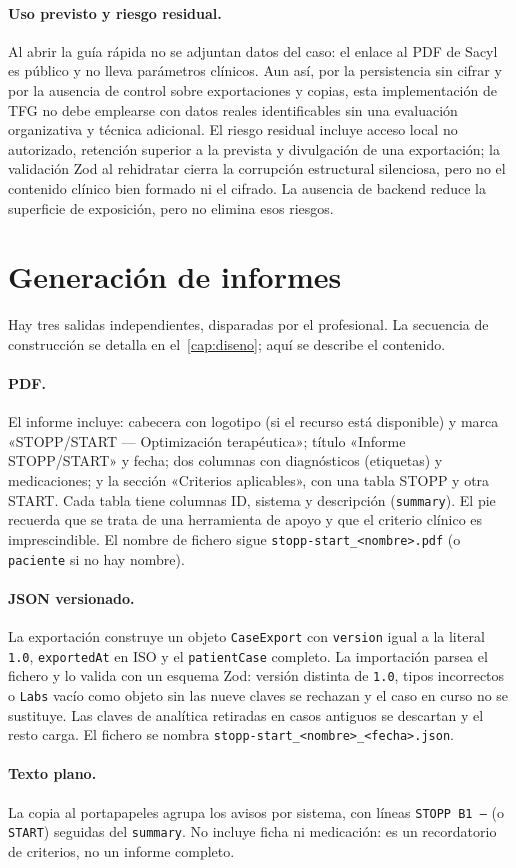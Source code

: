 \paragraph{Uso previsto y riesgo residual.}
Al abrir la guía rápida no se adjuntan datos del caso: el enlace al PDF de
Sacyl~\cite{sacyl2023stopp} es público y no lleva parámetros clínicos. Aun
así, por la persistencia sin cifrar y por la ausencia de control sobre
exportaciones y copias, esta implementación de TFG no debe emplearse con
datos reales identificables sin una evaluación organizativa y técnica
adicional. El riesgo residual incluye acceso local no autorizado,
retención superior a la prevista y divulgación de una exportación; la
validación Zod al rehidratar cierra la corrupción estructural silenciosa,
pero no el contenido clínico bien formado ni el cifrado. La ausencia de
backend reduce la superficie de exposición, pero no elimina esos riesgos.

\section{Generación de informes}
\label{sec:informes}

Hay tres salidas independientes, disparadas por el profesional. La secuencia
de construcción se detalla en el~\cref{cap:diseno}; aquí se describe el
contenido.

\paragraph{PDF.}
El informe incluye: cabecera con logotipo (si el recurso está disponible) y
marca «STOPP/START --- Optimización terapéutica»; título «Informe
STOPP/START» y fecha; dos columnas con diagnósticos (etiquetas) y
medicaciones; y la sección «Criterios aplicables», con una tabla STOPP y
otra START. Cada tabla tiene columnas ID, sistema y descripción
(\texttt{summary}). El pie recuerda que se trata de una herramienta de apoyo
y que el criterio clínico es imprescindible. El nombre de fichero sigue
\texttt{stopp-start\_<nombre>.pdf} (o \texttt{paciente} si no hay nombre).

\paragraph{JSON versionado.}
La exportación construye un objeto \texttt{CaseExport} con
\texttt{version} igual a la literal \texttt{1.0}, \texttt{exportedAt} en ISO
y el \texttt{patientCase} completo. La importación parsea el fichero y lo
valida con un esquema Zod: versión distinta de \texttt{1.0}, tipos
incorrectos o \texttt{Labs} vacío como objeto sin las nueve claves se
rechazan y el caso en curso no se sustituye. Las claves de analítica
retiradas en casos antiguos se descartan y el resto carga. El fichero se
nombra \texttt{stopp-start\_<nombre>\_<fecha>.json}.

\paragraph{Texto plano.}
La copia al portapapeles agrupa los avisos por sistema, con líneas
\texttt{STOPP B1 ---} (o \texttt{START}) seguidas del \texttt{summary}. No
incluye ficha ni medicación: es un recordatorio de criterios, no un informe
completo.
